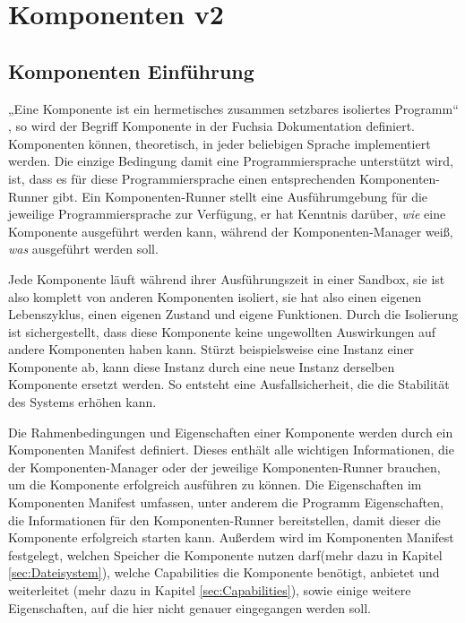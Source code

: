 \documentclass[a4paper]{scrartcl}
\begin{document}
\section{Komponenten v2}
\subsection{Komponenten Einführung}
\label{sec:Components}
„Eine Komponente ist ein hermetisches zusammen setzbares isoliertes Programm“ \cite{Fuchsia.Components.Introduction}, so wird der Begriff Komponente in der Fuchsia Dokumentation definiert. Komponenten können, theoretisch, in jeder beliebigen Sprache implementiert werden. Die einzige Bedingung damit eine Programmiersprache unterstützt wird, ist, dass es für diese Programmiersprache einen entsprechenden Komponenten-Runner gibt. Ein Komponenten-Runner stellt eine Ausführumgebung für die jeweilige Programmiersprache zur Verfügung, er hat Kenntnis darüber, \textit{wie} eine Komponente ausgeführt werden kann, während der Komponenten-Manager weiß, \textit{was} ausgeführt werden soll.

Jede Komponente läuft während ihrer Ausführungszeit in einer Sandbox, sie ist also komplett von anderen Komponenten isoliert, sie hat also einen eigenen Lebenszyklus, einen eigenen Zustand und eigene Funktionen. Durch die Isolierung ist sichergestellt, dass diese Komponente keine ungewollten Auswirkungen auf andere Komponenten haben kann. Stürzt beispielsweise eine Instanz einer Komponente ab, kann diese Instanz durch eine neue Instanz derselben Komponente ersetzt werden. So entsteht eine Ausfallsicherheit, die die Stabilität des Systems erhöhen kann. \cite{Fuchsia.Components.Introduction}

Die Rahmenbedingungen und Eigenschaften einer Komponente werden durch ein Komponenten Manifest definiert. Dieses enthält alle wichtigen Informationen, die der Komponenten-Manager oder der jeweilige Komponenten-Runner brauchen, um die Komponente erfolgreich ausführen zu können.
Die Eigenschaften im Komponenten Manifest umfassen, unter anderem die Programm Eigenschaften, die Informationen für den Komponenten-Runner bereitstellen, damit dieser die Komponente erfolgreich starten kann. Außerdem wird im Komponenten Manifest festgelegt, welchen Speicher die Komponente nutzen darf(mehr dazu in Kapitel \ref{sec:Dateisystem}),  welche Capabilities die Komponente benötigt, anbietet und weiterleitet (mehr dazu in Kapitel \ref{sec:Capabilities}), sowie einige weitere Eigenschaften, auf die hier nicht genauer eingegangen werden soll. \cite{Fuchsia.Components} 
\end{document}
